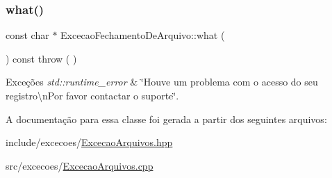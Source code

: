 \subsubsection{\texorpdfstring{what()}{what()}}
{\footnotesize\ttfamily const char $\ast$ Excecao\+Fechamento\+De\+Arquivo\+::what (\begin{DoxyParamCaption}{ }\end{DoxyParamCaption}) const throw ( ) \hspace{0.3cm}{\ttfamily [virtual]}}


\begin{DoxyExceptions}{Exceções}
{\em std\+::runtime\+\_\+error} & \char`\"{}\+Houve um problema com o acesso do seu registro\textbackslash{}n\+Por favor contactar o suporte\char`\"{}. \\
\hline
\end{DoxyExceptions}


A documentação para essa classe foi gerada a partir dos seguintes arquivos\+:\begin{DoxyCompactItemize}
\item 
include/excecoes/\mbox{\hyperlink{_excecao_arquivos_8hpp}{Excecao\+Arquivos.\+hpp}}\item 
src/excecoes/\mbox{\hyperlink{_excecao_arquivos_8cpp}{Excecao\+Arquivos.\+cpp}}\end{DoxyCompactItemize}
